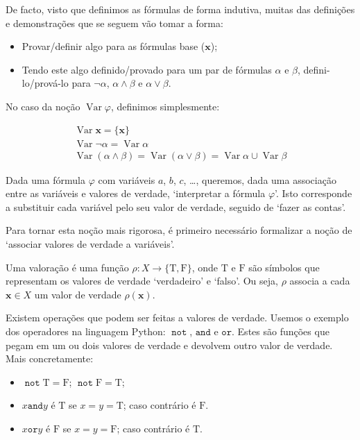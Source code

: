 \documentclass{report}
\theoremstyle{definition}
\theoremstyle{remark}
\renewcommand{\bf}[1]{\mathbf{#1}}
\newcommand{\lt}{\mathrm{T}}
\newcommand{\lf}{\mathrm{F}}
\DeclareMathOperator{\var}{Var}
\DeclareMathOperator{\pnot}{\texttt{not}}
\newcommand{\pand}{\mathbin{\texttt{and}}}
\newcommand{\por}{\mathbin{\texttt{or}}}
\begin{document}
	De facto, visto que definimos as fórmulas de forma indutiva, muitas das definições e demonstrações que se seguem vão tomar a forma:
	
	\begin{itemize}
	\item Provar/definir algo para as fórmulas base ($\bf x$);
	
	\item Tendo este algo definido/provado para um par de fórmulas $\alpha$ e $\beta$, defini-lo/prová-lo para $\neg \alpha$, $\alpha \land \beta$ e $\alpha \lor \beta$.
	\end{itemize}
	
	No caso da noção $\var \varphi$, definimos simplesmente:
	
	\begin{gather*}
	\var \bf x = \{\bf x\}\\
	\var \neg \alpha = \var \alpha\\
	\var (\alpha \land \beta) = \var (\alpha \lor \beta) = \var \alpha \cup \var \beta
	\end{gather*}
	
	Dada uma fórmula $\varphi$ com variáveis $a$, $b$, $c$, \dots, queremos, dada uma associação entre as variáveis e valores de verdade, `interpretar a fórmula $\varphi$'. Isto corresponde a substituir cada variável pelo seu valor de verdade, seguido de `fazer as contas'.
	
	Para tornar esta noção mais rigorosa, é primeiro necessário formalizar a noção de `associar valores de verdade a variáveis'.
	
	Uma valoração é uma função $\rho : X \to \{\lt, \lf\}$, onde $\lt$ e $\lf$ são símbolos que representam os valores de verdade `verdadeiro' e `falso'. Ou seja, $\rho$ associa a cada $\bf x \in X$ um valor de verdade $\rho(\bf x)$.
	
	Existem operações que podem ser feitas a valores de verdade. Usemos o exemplo dos operadores na linguagem Python: $\pnot$, $\pand$ e $\por$. Estes são funções que pegam em um ou dois valores de verdade e devolvem outro valor de verdade. Mais concretamente:
	
	\begin{itemize}
	\item $\pnot \lt = \lf$; $\pnot \lf = \lt$;
	
	\item $x \pand y$ é $\lt$ se $x = y = \lt$; caso contrário é $\lf$.
	
	\item $x \por y$ é $\lf$ se $x = y = \lf$; caso contrário é $\lt$.
	\end{itemize}
	
\end{document}
